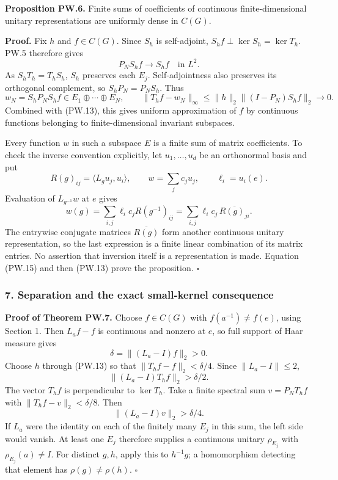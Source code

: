 \documentclass[
  11pt,
]{article}
\begin{document}
\textbf{Proposition PW.6.} Finite sums of coefficients of continuous
finite-dimensional unitary representations are uniformly dense in
\(C(G)\).

\textbf{Proof.} Fix \(h\) and \(f\in C(G)\). Since \(S_h\) is
self-adjoint, \(S_hf\perp\ker S_h=\ker T_h\). PW.5 therefore gives \[
P_NS_hf\longrightarrow S_hf\quad\text{in }L^2.
\] As \(S_hT_h=T_hS_h\), \(S_h\) preserves each \(E_j\).
Self-adjointness also preserves its orthogonal complement, so
\(S_hP_N=P_NS_h\). Thus \[
w_N=S_hP_NS_hf\in E_1\oplus\cdots\oplus E_N,
\qquad
\|T_hf-w_N\|_\infty
\leq\|h\|_2\|(I-P_N)S_hf\|_2\longrightarrow0.
\tag{PW.15}
\] Combined with (PW.13), this gives uniform approximation of \(f\) by
continuous functions belonging to finite-dimensional invariant
subspaces.

Every function \(w\) in such a subspace \(E\) is a finite sum of matrix
coefficients. To check the inverse convention explicitly, let
\(u_1,\ldots,u_d\) be an orthonormal basis and put \[
R(g)_{ij}=\langle L_gu_j,u_i\rangle,\qquad
w=\sum_j c_ju_j,\qquad \ell_i=u_i(e).
\] Evaluation of \(L_{g^{-1}}w\) at \(e\) gives \[
w(g)=\sum_{i,j}\ell_i c_jR(g^{-1})_{ij}
=\sum_{i,j}\ell_i c_j\,\overline{R(g)_{ji}}.
\tag{PW.16}
\] The entrywise conjugate matrices \(\overline{R(g)}\) form another
continuous unitary representation, so the last expression is a finite
linear combination of its matrix entries. No assertion that inversion
itself is a representation is made. Equation (PW.15) and then (PW.13)
prove the proposition. \(\square\)

\subsubsection{7. Separation and the exact small-kernel
consequence}\label{separation-and-the-exact-small-kernel-consequence}

\textbf{Proof of Theorem PW.7.} Choose \(f\in C(G)\) with
\(f(a^{-1})\ne f(e)\), using Section 1. Then \(L_af-f\) is continuous
and nonzero at \(e\), so full support of Haar measure gives \[
\delta=\|(L_a-I)f\|_2>0.
\] Choose \(h\) through (PW.13) so that \(\|T_hf-f\|_2<\delta/4\). Since
\(\|L_a-I\|\leq2\), \[
\|(L_a-I)T_hf\|_2>\delta/2.
\tag{PW.17}
\] The vector \(T_hf\) is perpendicular to \(\ker T_h\). Take a finite
spectral sum \(v=P_NT_hf\) with \(\|T_hf-v\|_2<\delta/8\). Then \[
\|(L_a-I)v\|_2>\delta/4.
\tag{PW.18}
\] If \(L_a\) were the identity on each of the finitely many \(E_j\) in
this sum, the left side would vanish. At least one \(E_j\) therefore
supplies a continuous unitary \(\rho_{E_j}\) with
\(\rho_{E_j}(a)\ne I\). For distinct \(g,h\), apply this to \(h^{-1}g\);
a homomorphism detecting that element has \(\rho(g)\ne\rho(h)\).
\(\square\)
\end{document}
